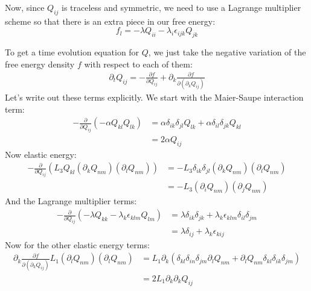 \documentclass[reqno]{article}
\begin{document}
	Now, since $Q_{ij}$ is traceless and symmetric, we need to use a Lagrange multiplier scheme so that there is an extra piece in our free energy:
	\begin{equation}
		f_l = - \lambda Q_{ii} - \lambda_i \epsilon_{ijk} Q_{jk}
	\end{equation}
	
	To get a time evolution equation for $Q$, we just take the negative variation of the free energy density $f$ with respect to each of them:
	\begin{equation}
	\begin{split}
		\partial_t Q_{ij} 
		= - \frac{\partial f}{\partial Q_{ij}} 
		+ \partial_k \frac{\partial f}{\partial (\partial_k Q_{ij})}
	\end{split}
	\end{equation}
	Let's write out these terms explicitly.
	We start with the Maier-Saupe interaction term:
	\begin{equation}
	\begin{split}
		-\frac{\partial}{\partial Q_{ij}} \left(-\alpha Q_{kl} Q_{lk} \right)
		&= \alpha \delta_{ik} \delta_{jl} Q_{lk}
		+ \alpha \delta_{il} \delta_{jk} Q_{kl} \\
		&= 2 \alpha Q_{ij}
	\end{split}
	\end{equation}
	Now elastic energy:
	\begin{equation}
	\begin{split}
		-\frac{\partial}{\partial Q_{ij}} \left( L_3 Q_{kl} (\partial_k Q_{nm}) (\partial_l Q_{nm}) \right)
		&= - L_3 \delta_{ik} \delta_{jl} (\partial_k Q_{nm}) (\partial_l Q_{nm}) \\
		&= -L_3 (\partial_i Q_{nm}) (\partial_j Q_{nm})
	\end{split}
	\end{equation}
	And the Lagrange multiplier terms:
	\begin{equation}
	\begin{split}
		-\frac{\partial}{\partial Q_{ij}} \left(
		- \lambda Q_{kk} - \lambda_k \epsilon_{klm} Q_{lm}
		\right)
		&= \lambda \delta_{ik} \delta_{jk}
		+ \lambda_k \epsilon_{klm} \delta_{il} \delta_{jm} \\
		&= \lambda \delta_{ij} + \lambda_k \epsilon_{kij}
	\end{split}
	\end{equation}
	Now for the other elastic energy terms:
	\begin{equation}
	\begin{split}
		\partial_k \frac{\partial f}{\partial (\partial_k Q_{ij})} L_1 (\partial_l Q_{nm})(\partial_l Q_{nm})
		&= L_1 \partial_k \left( \delta_{kl} \delta_{in} \delta_{jm} \partial_l Q_{nm}
		+ \partial_l Q_{nm} \delta_{kl} \delta_{ik} \delta_{jm} \right) \\
		&= 2 L_1 \partial_k \partial_k Q_{ij}
	\end{split}
	\end{equation}
\end{document}
